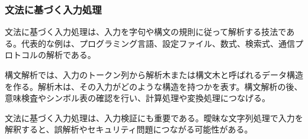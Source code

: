\subsubsection{文法に基づく入力処理}

文法に基づく入力処理は、入力を字句や構文の規則に従って解析する技法である。代表的な例は、プログラミング言語、設定ファイル、数式、検索式、通信プロトコルの解析である。

構文解析では、入力のトークン列から解析木または構文木と呼ばれるデータ構造を作る。解析木は、その入力がどのような構造を持つかを表す。構文解析の後、意味検査やシンボル表の確認を行い、計算処理や変換処理につなげる。

文法に基づく入力処理は、入力検証にも重要である。曖昧な文字列処理で入力を解釈すると、誤解析やセキュリティ問題につながる可能性がある。
